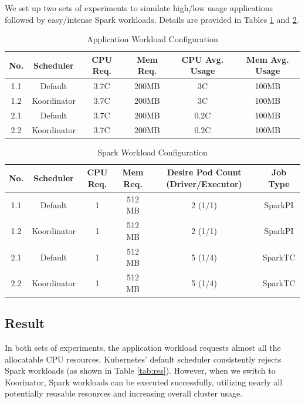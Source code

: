 We set up two sets of experiments to simulate high/low usage applications followed by easy/intense Spark workloads. Details are provided in Tables \ref{tab:conf-app} and \ref{tab:conf-spark}.


\begin{table}[h]
	\centering
	\begin{tabular}{cccccc}
		No. & Scheduler   & CPU Req. & Mem Req. & CPU Avg. Usage & Mem Avg. Usage \\
		\hline
		1.1   & Default     & 3.7C     & 200MB    & 3C             & 100MB          \\
		1.2   & Koordinator & 3.7C     & 200MB    & 3C             & 100MB          \\
		2.1   & Default     & 3.7C     & 200MB    & 0.2C           & 100MB          \\
		2.2   & Koordinator & 3.7C     & 200MB    & 0.2C           & 100MB
	\end{tabular}
	\caption{Application Workload Configuration}
	\label{tab:conf-app}

\end{table}

\begin{table}[h]
	\centering
	\begin{tabular}{cccccc}
		No. & Scheduler   & CPU Req. & Mem Req. & Desire Pod Count (Driver/Executor) & Job Type \\
		\hline
		1.1 & Default     & 1        & 512 MB   & 2 (1/1)                            & SparkPI  \\
		1.2 & Koordinator & 1        & 512 MB   & 2 (1/1)                            & SparkPI  \\
		2.1 & Default     & 1        & 512 MB   & 5 (1/4)                            & SparkTC  \\
		2.2 & Koordinator & 1        & 512 MB   & 5 (1/4)                            & SparkTC
	\end{tabular}
	\caption{Spark Workload Configuration}
	\label{tab:conf-spark}
\end{table}

\subsection{Result}

In both sets of experiments, the application workload requests almost all the allocatable CPU resources. Kubernetes' default scheduler consistently rejects Spark workloads (as shown in Table \ref{tab:res}). However, when we switch to Koorinator, Spark workloads can be executed successfully, utilizing nearly all potentially reusable resources and increasing overall cluster usage.


